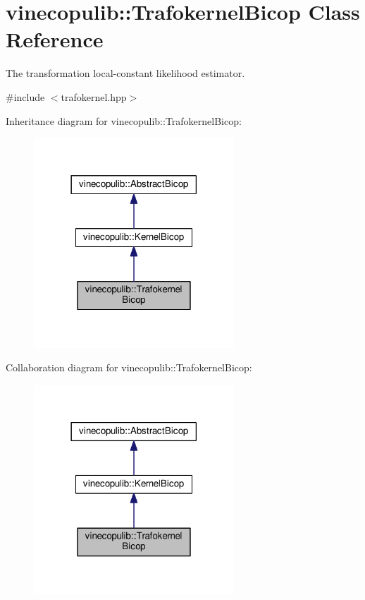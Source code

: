 \hypertarget{classvinecopulib_1_1_trafokernel_bicop}{}\section{vinecopulib\+:\+:Trafokernel\+Bicop Class Reference}
\label{classvinecopulib_1_1_trafokernel_bicop}


The transformation local-\/constant likelihood estimator.  




{\ttfamily \#include $<$trafokernel.\+hpp$>$}



Inheritance diagram for vinecopulib\+:\+:Trafokernel\+Bicop\+:\nopagebreak
\begin{figure}[H]
\begin{center}
\leavevmode
\includegraphics[width=213pt]{classvinecopulib_1_1_trafokernel_bicop__inherit__graph}
\end{center}
\end{figure}


Collaboration diagram for vinecopulib\+:\+:Trafokernel\+Bicop\+:\nopagebreak
\begin{figure}[H]
\begin{center}
\leavevmode
\includegraphics[width=213pt]{classvinecopulib_1_1_trafokernel_bicop__coll__graph}
\end{center}
\end{figure}
